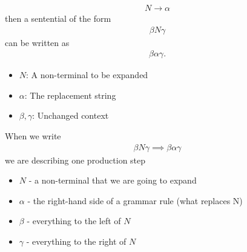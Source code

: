\documentclass{report}
\begin{document}
\begin{itemize}
            \begin{align*}
                N  \to \alpha
            \end{align*}
            then a sentential of the form
            \begin{align*}
                \beta N \gamma
            \end{align*}
            can be written as
            \begin{align*}
                \beta \alpha \gamma
            .\end{align*}
            \begin{itemize}
                \item $N$: A non-terminal to be expanded
                \item $\alpha$: The replacement string
                \item $\beta, \gamma$: Unchanged context
            \end{itemize}
            When we write
            \begin{align*}
                \beta N \gamma \implies \beta \alpha \gamma
            \end{align*}
            we are describing one production step
            \begin{itemize}
                \item $N$ - a non-terminal that we are going to expand
                \item $\alpha $ - the right-hand side of a grammar rule (what replaces N)
                \item $\beta$ - everything to the left of $N$
                \item $\gamma$ - everything to the right of $N$
            \end{itemize}


\end{itemize}
\end{document}
